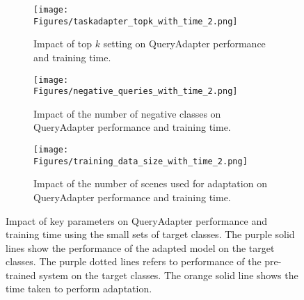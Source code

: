 
\begin{figure*}[t!]
\vspace{-1em}
\quad
    \begin{subfigure}[t]{0.3\textwidth}
    \centering
    \texttt{[image: Figures/taskadapter\_topk\_with\_time\_2.png]}
    \caption{Impact of top $k$ setting on QueryAdapter performance and training time.}
    \end{subfigure}
\quad
    \begin{subfigure}[t]{0.3\textwidth}
    \centering
    \texttt{[image: Figures/negative\_queries\_with\_time\_2.png]}
    \caption{Impact of the number of negative classes on QueryAdapter performance and training time.}
    \end{subfigure}
\quad
    \begin{subfigure}[t]{0.3\textwidth}
    \centering
    \texttt{[image: Figures/training\_data\_size\_with\_time\_2.png]}
    \caption{Impact of the number of scenes used for adaptation on QueryAdapter performance and training time.}
    \end{subfigure}
\caption{Impact of key parameters on QueryAdapter performance and training time using the small sets of target classes. The purple solid lines show the performance of the adapted model on the target classes. 
The purple dotted lines refers to performance of the pre-trained system on the target classes. 
The orange solid line shows the time taken to perform adaptation.}
\label{paramter_sensitivity}
\vspace{-1.5em}
\end{figure*}

\vspace{-0.3em}
